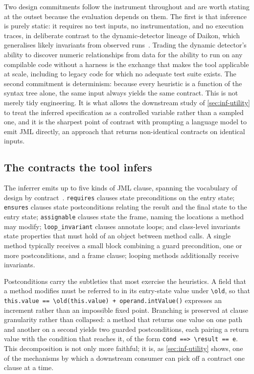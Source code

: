Two design commitments follow the instrument throughout and are worth stating at
the outset because the evaluation depends on them. The first is that inference is
purely static: it requires no test inputs, no instrumentation, and no execution
traces, in deliberate contrast to the dynamic-detector lineage of Daikon, which
generalises likely invariants from observed runs~\citep{ernst2007daikon}. Trading
the dynamic detector's ability to discover numeric relationships from data for the
ability to run on any compilable code without a harness is the exchange that makes
the tool applicable at scale, including to legacy code for which no adequate test
suite exists. The second commitment is determinism: because every heuristic is a
function of the syntax tree alone, the same input always yields the same contract.
This is not merely tidy engineering. It is what allows the downstream study of
\cref{sec:inf-utility} to treat the inferred specification as a controlled variable
rather than a sampled one, and it is the sharpest point of contrast with prompting a
language model to emit JML directly, an approach that returns non-identical
contracts on identical inputs.

\subsection{The contracts the tool infers}
\label{sec:inf-contract-kinds}

The inferrer emits up to five kinds of JML clause, spanning the vocabulary of
design by contract~\citep{meyer1992dbc,leavens2006jml}. \texttt{requires} clauses
state preconditions on the entry state; \texttt{ensures} clauses state
postconditions relating the result and the final state to the entry state;
\texttt{assignable} clauses state the frame, naming the locations a method may
modify; \texttt{loop\_invariant} clauses annotate loops; and class-level invariants
state properties that must hold of an object between method calls. A single method
typically receives a small block combining a guard precondition, one or more
postconditions, and a frame clause; looping methods additionally receive
invariants.

Postconditions carry the subtleties that most exercise the heuristics. A field that
a method modifies must be referred to in its entry-state value under
\lstinline|\old|, so that \lstinline|this.value == \old(this.value) + operand.intValue()|
expresses an increment rather than an impossible fixed point. Branching is
preserved at clause granularity rather than collapsed: a method that returns one
value on one path and another on a second yields two guarded postconditions, each
pairing a return value with the condition that reaches it, of the form
\lstinline|cond ==> \result == e|. This decomposition is not only more faithful; it
is, as \cref{sec:inf-utility} shows, one of the mechanisms by which a downstream
consumer can pick off a contract one clause at a time.


